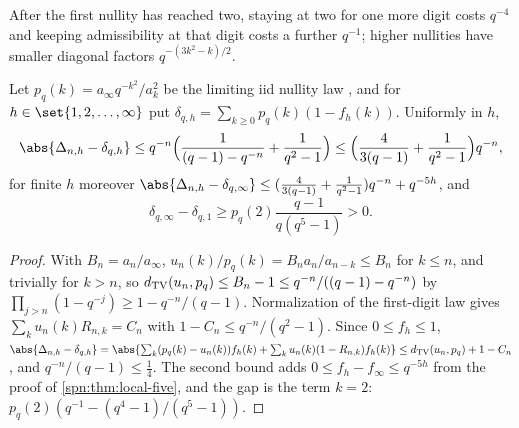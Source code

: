 After the first nullity has reached two, staying at two for one more digit costs $q^{-4}$ and keeping
admissibility at that digit costs a further $q^{-1}$; higher nullities have smaller diagonal factors
$q^{-(3k^2-k)/2}$.

\begin{theorem}\label{spn:thm:local-limit}
Let $p_q(k)=a_\infty q^{-k^2}/a_k^2$ be the limiting iid nullity law \cite{Fulman2015Stein}, and for
$h\in\set{1,2,\dots,\infty}$ put $\delta_{q,h}=\sum_{k\ge0}p_q(k)(1-f_h(k))$. Uniformly in $h$,
\[
 \abs{\Delta_{n,h}-\delta_{q,h}}\le q^{-n}\Bigl(\frac1{(q-1)-q^{-n}}+\frac1{q^2-1}\Bigr)\le
 \Bigl(\frac4{3(q-1)}+\frac1{q^2-1}\Bigr)q^{-n},
\]
for finite $h$ moreover $\abs{\Delta_{n,h}-\delta_{q,\infty}}\le(\frac4{3(q-1)}+\frac1{q^2-1})q^{-n}+q^{-5h}$,
and
\[
 \delta_{q,\infty}-\delta_{q,1}\ge p_q(2)\frac{q-1}{q(q^5-1)}>0 .
\]
\end{theorem}
\begin{proof}
With $B_n=a_n/a_\infty$, $u_n(k)/p_q(k)=B_na_n/a_{n-k}\le B_n$ for $k\le n$, and trivially for $k>n$,
so $d_{\mathrm{TV}}(u_n,p_q)\le B_n-1\le q^{-n}/((q-1)-q^{-n})$ by $\prod_{j>n}(1-q^{-j})\ge1-q^{-n}/(q-1)$.
Normalization of the first-digit law gives $\sum_ku_n(k)R_{n,k}=C_n$ with $1-C_n\le q^{-n}/(q^2-1)$.
Since $0\le f_h\le1$,
$\abs{\Delta_{n,h}-\delta_{q,h}}=\abs{\sum_k(p_q(k)-u_n(k))f_h(k)+\sum_ku_n(k)(1-R_{n,k})f_h(k)}\le\spnTV(u_n,p_q)+1-C_n$,
and $q^{-n}/(q-1)\le\tfrac14$. The second bound adds $0\le f_h-f_\infty\le q^{-5h}$ from the proof of
\cref{spn:thm:local-five}, and the gap is the term $k=2$:
$p_q(2)(q^{-1}-(q^4-1)/(q^5-1))$.
\end{proof}

